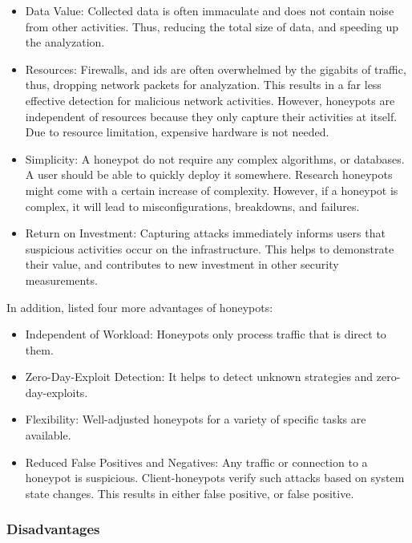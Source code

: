 \begin{itemize}
    \item Data Value: Collected data is often immaculate and does not contain noise from other activities.
          Thus, reducing the total size of data, and speeding up the analyzation.
    \item Resources: Firewalls, and \ac{ids} are often overwhelmed by the gigabits of traffic, thus, dropping network packets for analyzation.
          This results in a far less effective detection for malicious network activities.
          However, honeypots are independent of resources because they only capture their activities at itself.
          Due to resource limitation, expensive hardware is not needed.
    \item Simplicity: A honeypot do not require any complex algorithms, or databases.
          A user should be able to quickly deploy it somewhere.
          Research honeypots might come with a certain increase of complexity. 
          However, if a honeypot is complex, it will lead to misconfigurations, breakdowns, and failures.
    \item Return on Investment: Capturing attacks immediately informs users that suspicious activities occur on the infrastructure.
          This helps to demonstrate their value, and contributes to new investment in other security measurements.
\end{itemize}

In addition, \citet{NawrockiWSKS2016} listed four more advantages of honeypots:

\begin{itemize}
    \item Independent of Workload: Honeypots only process traffic that is direct to them.
    \item Zero-Day-Exploit Detection: It helps to detect unknown strategies and zero-day-exploits.
    \item Flexibility: Well-adjusted honeypots for a variety of specific tasks are available.
    \item Reduced False Positives and Negatives: Any traffic or connection to a honeypot is suspicious.
          Client-honeypots verify such attacks based on system state changes.
          This results in either false positive, or false positive.
\end{itemize}

\subsubsection{Disadvantages}

